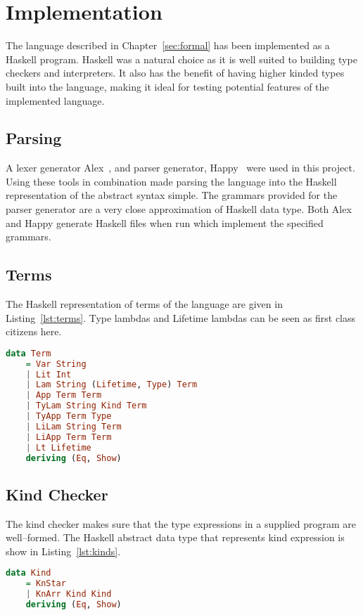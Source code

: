 \chapter{Implementation}\label{sec:impl}
The language described in Chapter~\ref{sec:formal} has been implemented as a
Haskell program. Haskell was a natural choice as it is well suited to building
type checkers and interpreters. It also has the benefit of having higher kinded
types built into the language, making it ideal for testing potential features
of the implemented language.

\section{Parsing}
A lexer generator Alex~\cite{alex}, and parser generator, Happy~\cite{happy}
were used in this project. Using these tools in combination made parsing the
language into the Haskell representation of the abstract syntax simple.
The grammars provided for the parser generator are a very close approximation
of Haskell data type. Both Alex and Happy generate Haskell files when run which
implement the specified grammars.

\section{Terms}
The Haskell representation of terms of the language are given in Listing~\ref{lst:terms}.
Type lambdas and Lifetime lambdas can be seen as first class citizens here.

\begin{lstlisting}[caption=Haskell representation of Terms., language=Haskell, label={lst:terms}]
data Term
    = Var String
    | Lit Int
    | Lam String (Lifetime, Type) Term
    | App Term Term
    | TyLam String Kind Term 
    | TyApp Term Type
    | LiLam String Term
    | LiApp Term Term
    | Lt Lifetime
    deriving (Eq, Show)
\end{lstlisting}

\section{Kind Checker}
The kind checker makes sure that the type expressions in a supplied program are
well--formed. The Haskell abstract data type that represents kind expression is
show in Listing~\ref{lst:kinds}.

\begin{lstlisting}[caption=Haskell representation of Kinds., language=Haskell, label={lst:kinds}]
data Kind
    = KnStar
    | KnArr Kind Kind
    deriving (Eq, Show)
\end{lstlisting}

